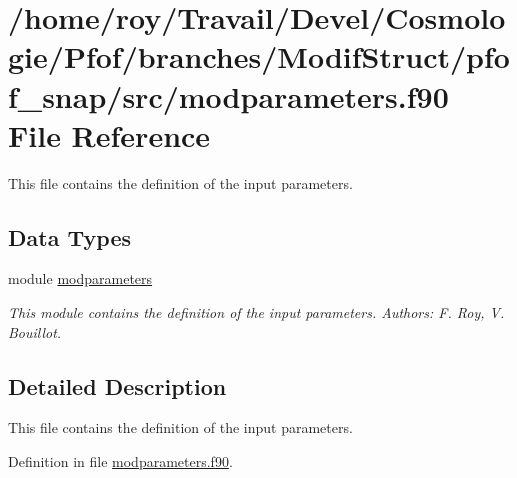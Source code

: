 \hypertarget{pfof__snap_2src_2modparameters_8f90}{\section{/home/roy/\-Travail/\-Devel/\-Cosmologie/\-Pfof/branches/\-Modif\-Struct/pfof\-\_\-snap/src/modparameters.f90 File Reference}
\label{pfof__snap_2src_2modparameters_8f90}
}


This file contains the definition of the input parameters.  


\subsection*{Data Types}
\begin{DoxyCompactItemize}
\item 
module \hyperlink{classmodparameters}{modparameters}
\begin{DoxyCompactList}\small\item\em This module contains the definition of the input parameters. Authors\-: F. Roy, V. Bouillot. \end{DoxyCompactList}\end{DoxyCompactItemize}


\subsection{Detailed Description}
This file contains the definition of the input parameters. 

Definition in file \hyperlink{pfof__snap_2src_2modparameters_8f90_source}{modparameters.\-f90}.

